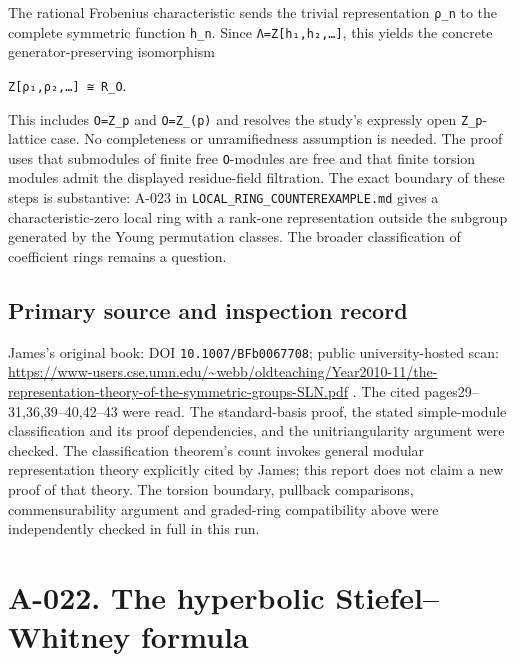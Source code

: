 \documentclass[
  10pt,
]{article}
\begin{document}
The rational Frobenius characteristic sends the trivial representation
\texttt{\small ρ\_\allowbreak{}n} to the complete symmetric function
\texttt{\small h\_\allowbreak{}n}. Since
\texttt{\small Λ=\allowbreak{}Z[\allowbreak{}h₁,\allowbreak{}h₂,\allowbreak{}…]\allowbreak{}},
this yields the concrete generator-preserving isomorphism

\texttt{\small Z[\allowbreak{}ρ₁,\allowbreak{}ρ₂,\allowbreak{}…]\allowbreak{} ≅ R\_\allowbreak{}O}.

This includes \texttt{\small O=\allowbreak{}Z\_\allowbreak{}p} and
\texttt{\small O=\allowbreak{}Z\_\allowbreak{}(\allowbreak{}p)\allowbreak{}}
and resolves the study's expressly open
\texttt{\small Z\_\allowbreak{}p}-lattice case. No completeness or
unramifiedness assumption is needed. The proof uses that submodules of
finite free \texttt{\small O}-modules are free and that finite torsion
modules admit the displayed residue-field filtration. The exact boundary
of these steps is substantive: A-023 in
\texttt{\small LOCAL\_\allowbreak{}RING\_\allowbreak{}COUNTEREXAMPLE.md}
gives a characteristic-zero local ring with a rank-one representation
outside the subgroup generated by the Young permutation classes. The
broader classification of coefficient rings remains a question.

\subsection{Primary source and inspection
record}\label{primary-source-and-inspection-record}

James's original book: DOI
\texttt{\small 10.1007/\allowbreak{}BFb0067708}; public
university-hosted scan:
\url{https://www-users.cse.umn.edu/~webb/oldteaching/Year2010-11/the-representation-theory-of-the-symmetric-groups-SLN.pdf}
. The cited pages29--31,36,39--40,42--43 were read. The standard-basis
proof, the stated simple-module classification and its proof
dependencies, and the unitriangularity argument were checked. The
classification theorem's count invokes general modular representation
theory explicitly cited by James; this report does not claim a new proof
of that theory. The torsion boundary, pullback comparisons,
commensurability argument and graded-ring compatibility above were
independently checked in full in this run.

\section{A-022. The hyperbolic Stiefel--Whitney
formula}\label{a-022.-the-hyperbolic-stiefelwhitney-formula}
\end{document}
